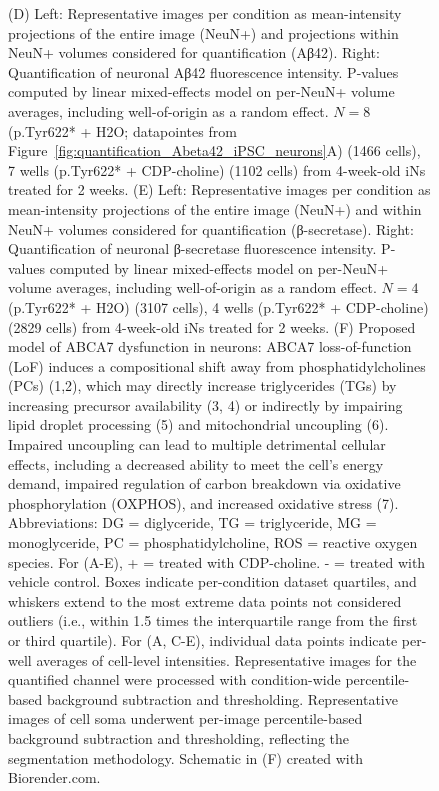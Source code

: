 \begin{figure}[ht]
{        (D) Left: Representative images per condition as mean-intensity projections of the entire image (NeuN+) and projections within NeuN+ volumes considered for quantification (Aβ42). Right: Quantification of neuronal Aβ42 fluorescence intensity. P-values computed by linear mixed-effects model on per-NeuN+ volume averages, including well-of-origin as a random effect. $N = 8$ (p.Tyr622* + H2O; datapointes from Figure~\ref{fig:quantification_Abeta42_iPSC_neurons}A) (1466 cells), 7 wells (p.Tyr622* + CDP-choline) (1102 cells) from 4-week-old iNs treated for 2 weeks. 
        (E) Left: Representative images per condition as mean-intensity projections of the entire image (NeuN+) and within NeuN+ volumes considered for quantification (β-secretase). Right: Quantification of neuronal β-secretase fluorescence intensity. P-values computed by linear mixed-effects model on per-NeuN+ volume averages, including well-of-origin as a random effect. $N = 4$ (p.Tyr622* + H2O) (3107 cells), 4 wells (p.Tyr622* + CDP-choline) (2829 cells) from 4-week-old iNs treated for 2 weeks. 
        (F) Proposed model of ABCA7 dysfunction in neurons: ABCA7 loss-of-function (LoF) induces a compositional shift away from phosphatidylcholines (PCs) (1,2), which may directly increase triglycerides (TGs) by increasing precursor availability (3, 4) or indirectly by impairing lipid droplet processing (5) and mitochondrial uncoupling (6). Impaired uncoupling can lead to multiple detrimental cellular effects, including a decreased ability to meet the cell’s energy demand, impaired regulation of carbon breakdown via oxidative phosphorylation (OXPHOS), and increased oxidative stress (7). Abbreviations: DG = diglyceride, TG = triglyceride, MG = monoglyceride, PC = phosphatidylcholine, ROS = reactive oxygen species. For (A-E),  + = treated with CDP-choline. - = treated with vehicle control. Boxes indicate per-condition dataset quartiles, and whiskers extend to the most extreme data points not considered outliers (i.e., within 1.5 times the interquartile range from the first or third quartile). For (A, C-E), individual data points indicate per-well averages of cell-level intensities. Representative images for the quantified channel were processed with condition-wide percentile-based background subtraction and thresholding. Representative images of cell soma underwent per-image percentile-based background subtraction and thresholding, reflecting the segmentation methodology. Schematic in (F) created with Biorender.com.
    }
    \label{fig:main_choline}
\end{figure}